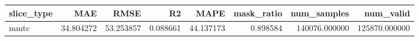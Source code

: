 \begin{tabular}{lrrrrrrr}
\toprule
slice_type & MAE & RMSE & R2 & MAPE & mask_ratio & num_samples & num_valid \\
\midrule
mmtc & 34.804272 & 53.253857 & 0.088661 & 44.137173 & 0.898584 & 140076.000000 & 125870.000000 \\
\bottomrule
\end{tabular}
